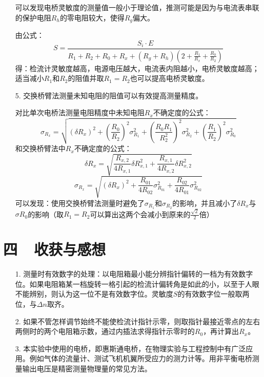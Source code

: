 \documentclass[a4paper]{ctexbook}
\begin{document}
\begin{itemize}
    可以发现电桥灵敏度的测量值一般小于理论值，推测可能是因为与电流表串联的保护电阻$R_h$的零电阻较大，使得$R_g$偏大。

    由公式：
    \[S = \frac{S_i\cdot E}{R_1+R_2+R_0+R_x+(R_g+R_h)\left(2+\frac{R_1}{R_x}+\frac{R_0}{R_2}\right)}\]
    得：检流计灵敏度越高，电源电压越大，电流表内阻越小，电桥灵敏度越高；适当减小$R_1$和$R_2$的阻值并取$R_1=R_2$也可以提高电桥灵敏度。

    \medskip
    \item[5.] 交换桥臂法测量未知电阻的阻值可以有效提高测量精度。

    \noindent 对比单次电桥法测量电阻精度中未知电阻$R_x$不确定度的公式：
    \[
    \sigma_{R_x} = \sqrt{(\delta R_x)^2+\left(\frac{R_0}{R_2}\right)^2\sigma_{R_1}^2+\left(\frac{R_0R_1}{R_2^2}\right)^2\sigma_{R_2}^2+\left(\frac{R_1}{R_2}\right)^2\sigma_{R_0}^2}
    \]
    和交换桥臂法中$R_x$不确定度的公式：
    \[
    \delta R_x = \sqrt{\frac{R_{x,2}}{4R_{x,1}}\delta R_{x,1}^2+\frac{R_{x,1}}{4R_{x,2}}\delta R_{x,2}^2}
    \]
    \[
    \sigma_{R_x} = \sqrt{(\delta R_x)^2+\frac{R_{01}}{4R_{02}}\sigma_{R_{01}}^2+\frac{R_{02}}{4R_{01}}\sigma_{R_{02}}^2}
    \]
    可以发现：使用交换桥臂法测量时避免了$\sigma_{R_1}$和$\sigma_{R_2}$的影响，并且减小了$\delta R_x$与$\sigma{R_0}$的影响（取$R_1=R_2$可以算出这两个会减小到原来的$\frac{\sqrt{2}}{2}$倍）

\end{itemize}

    \bigskip
    \section*{ 四\ \ 收获与感想}

\begin{itemize}
    \item[1.] 测量时有效数字的处理：以电阻箱最小能分辨指针偏转的一档为有效数字位。如果电阻箱某一档旋转一格引起的检流计偏转角是如此的小，以至于人眼不能辨别，则认为这一位不是有效数字位。灵敏度$S$的有效数字位一般取两位，与$\Delta n$取齐。

    \medskip
    \item[2.] 如果不管怎样调节始终不能使检流计指针示零，则取指针最接近零点的左右两侧时的两个电阻箱示数，通过内插法求得指针示零时的$R_0$，再计算出$R_x$。

    \medskip
    \item[3.] 本实验中使用的电桥，即惠斯通电桥，在物理实验与工程控制中有广泛应用。例如气体的流量计、测试飞机机翼所受应力的测力计等。用非平衡电桥测量输出电压是精密测量物理量的常见方法。
\end{itemize}
\end{document}
